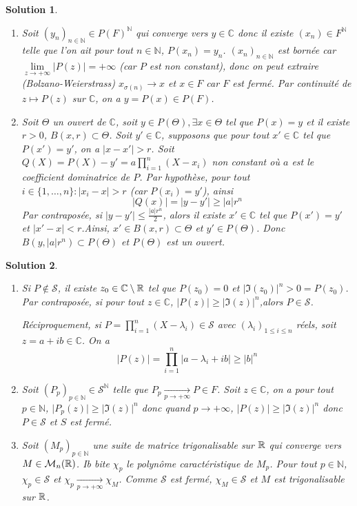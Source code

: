 \documentclass[12pt]{article}
\newtheorem{solution}{Solution}[section]
\theoremstyle{remark}
\newcommand{\C}{\mathbb{C}} \newcommand{\Q}{\mathbb{Q}}
\newcommand{\N}{\mathbb{N}} \newcommand{\Z}{\mathbb{Z}}
\newcommand{\M}{\mathcal{M}} \renewcommand{\L}{\mathcal{L}}
\begin{document}
\begin{solution}
	\phantom{}
	\begin{enumerate}
		\item Soit $(y_{n})_{n\in\N}\in P(F)^{\N}$ qui converge vers $y\in\C$ donc il existe $(x_{n})\in F^{\N}$ telle que l'on ait pour tout $n\in\N$, $P(x_{n})=y_{n}$. $(x_{n})_{n\in\N}$ est bornée car $\lim\limits_{z\to+\infty}\vert P(z)\vert=+\infty$ (car $P$ est non constant), donc on peut extraire (Bolzano-Weierstrass) $x_{\sigma(n)}\to x$ et $x\in F$ car $F$ est fermé. Par continuité de $z\mapsto P(z)$ sur $\C$, on a $y=P(x)\in P(F)$.
		
		\item Soit $\Theta$ un ouvert de $\C$, soit $y\in P(\Theta),\exists x\in\Theta$ tel que $P(x)=y$ et il existe $r>0$, $B(x,r)\subset\Theta$. Soit $y'\in\C$, supposons que pour tout $x'\in\C$ tel que $P(x')=y'$, on a $\vert x-x'\vert>r$. Soit $Q(X)=P(X)-y'=a\prod_{i=1}^{n}(X-x_{i})$ non constant où $a$ est le coefficient dominatrice de $P$. Par hypothèse, pour tout $i\in\{1,\dots,n\}\colon\vert x_{i}-x\vert>r$ (car $P(x_{i})=y'$), ainsi 
		$$\vert Q(x)\vert=\vert y-y'\vert\geqslant\vert a\vert r^{n}$$
		Par contraposée, si $\vert y-y'\vert\leqslant\frac{\vert a\vert r^{n}}{2}$, alors il existe $x'\in\C$ tel que $P(x')=y'$ et $\vert x'-x\vert<r$.Ainsi, $x'\in B(x,r)\subset\Theta$ et $y'\in P(\Theta)$. Donc $B(y,\vert a\vert r^{n})\subset P(\Theta)$ et $P(\Theta)$ est un ouvert.
	\end{enumerate}
\end{solution}

\begin{solution}
	\phantom{}
	\begin{enumerate}
		\item Si $P\notin\mathcal{S}$, il existe $z_{0}\in\C\setminus\R$ tel que $P(z_{0})=0$ et $\vert\Im(z_{0})\vert^{n}>0=P(z_{0})$. Par contraposée, si pour tout $z\in\C$, $\vert P(z)\vert\geqslant\vert\Im(z_{})\vert^{n}$,alors $P\in\mathcal{S}$.

		Réciproquement, si $P=\prod_{i=1}^{n}(X-\lambda_{i})\in\mathcal{S}$ avec $(\lambda_{i})_{1\leqslant i\leqslant n}$ réels, soit $z=a+ib\in\C$. On a
		$$\vert P(z)\vert=\prod_{i=1}^{n}\vert a-\lambda_{i}+ib\vert\geqslant\vert b\vert^{n}$$
		
		\item Soit $(P_{p})_{p\in\N}\in\mathcal{S}^{\N}$ telle que $P_{p}\xrightarrow[p\to+\infty]{}P\in F$. Soit $z\in\C$, on a pour tout $p\in\N$, $\vert P_{p}(z)\vert\geqslant\vert\Im(z)\vert^{n}$ donc quand $p\to+\infty$, $\vert P(z)\vert\geqslant\vert\Im(z)\vert^{n}$ donc $P\in\mathcal{S}$ et $S$ est fermé.
		
		\item Soit $(M_{p})_{p\in\N}$ une suite de matrice trigonalisable sur $\mathbb{R}$ qui converge vers $M\in\M_{n}(\R)$. Ib bite $\chi_{p}$ le polynôme caractéristique de $M_{p}$. Pour tout $p\in\N$, $\chi_{p}\in\mathcal{S}$ et $\chi_{p}\xrightarrow[p\to+\infty]{}\chi_{M}$. Comme $\mathcal{S}$ est fermé, $\chi_{M}\in \mathcal{S}$ et $M$ est trigonalisable sur $\mathbb{R}$.
	\end{enumerate}
\end{solution}
\end{document}
